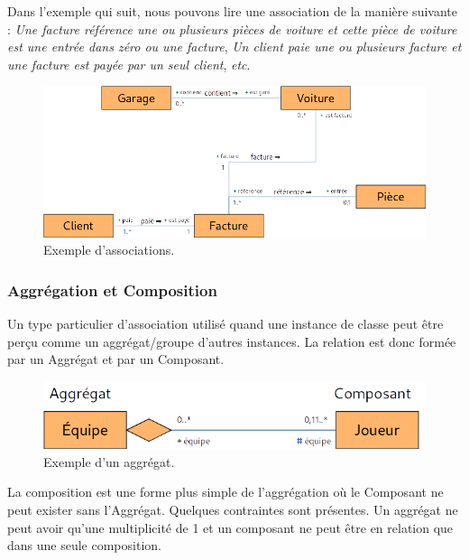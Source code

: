 \documentclass[../Syllabus.tex]{subfiles}
\begin{document}
Dans l'exemple qui suit, nous pouvons lire une association de la manière suivante : \textit{Une facture référence une ou plusieurs pièces de voiture et cette pièce de voiture est une entrée dans zéro ou une facture}, \textit{Un client paie une ou plusieurs facture et une facture est payée par un seul client}, \textit{etc}.

\begin{figure}[htp]
    \centering
    \includegraphics[width=16cm]{./img/chapter2-associations.png}
    \caption{Exemple d'associations.}
    \label{fig:chapter2-associations}
\end{figure}


\subsubsection{Aggrégation et Composition}

Un type particulier d'association utilisé quand une instance de classe peut être perçu comme un aggrégat/groupe d'autres instances. La relation est donc formée par un Aggrégat et par un Composant.

\begin{figure}[htp]
    \centering
    \includegraphics[width=12cm]{./img/chapter2-aggregat.png}
    \caption{Exemple d'un aggrégat.}
    \label{fig:chapter2-aggregat}
\end{figure}

La composition est une forme plus simple de l'aggrégation où le Composant ne peut exister sans l'Aggrégat. Quelques contraintes sont présentes. Un aggrégat ne peut avoir qu'une multiplicité de 1 et un composant ne peut être en relation que dans une seule composition.
\end{document}
